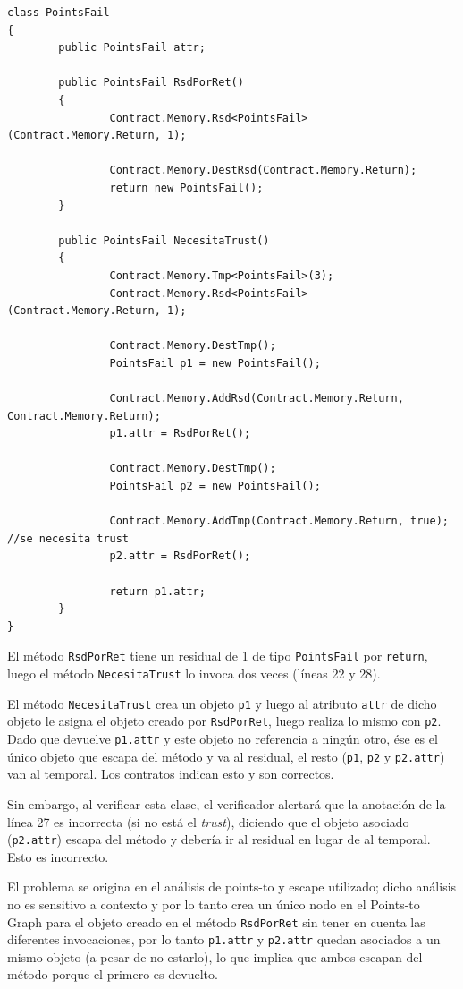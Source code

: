 \documentclass[12pt,a4paper]{article}
\newcommand\mono[1]{\texttt{#1}}
\begin{document}
			\vspace{15pt}
			\begin{footnotesize}
			\begin{lstlisting}[caption=Ejemplo donde \textit{trust} es necesario]
class PointsFail
{
		public PointsFail attr;

		public PointsFail RsdPorRet()
		{
				Contract.Memory.Rsd<PointsFail>(Contract.Memory.Return, 1);

				Contract.Memory.DestRsd(Contract.Memory.Return);
				return new PointsFail();
		}

		public PointsFail NecesitaTrust()
		{
				Contract.Memory.Tmp<PointsFail>(3);
				Contract.Memory.Rsd<PointsFail>(Contract.Memory.Return, 1);

				Contract.Memory.DestTmp();
				PointsFail p1 = new PointsFail();

				Contract.Memory.AddRsd(Contract.Memory.Return, Contract.Memory.Return);
				p1.attr = RsdPorRet();

				Contract.Memory.DestTmp();
				PointsFail p2 = new PointsFail();

				Contract.Memory.AddTmp(Contract.Memory.Return, true); //se necesita trust
				p2.attr = RsdPorRet();

				return p1.attr;
		}
}
			\end{lstlisting}
			\end{footnotesize}

			El método \mono{RsdPorRet} tiene un residual de 1 de tipo \mono{PointsFail} por \mono{return}, luego el método \mono{NecesitaTrust} lo invoca dos veces (líneas 22 y 28).

			El método \mono{NecesitaTrust} crea un objeto \mono{p1} y luego al atributo \mono{attr} de dicho objeto le asigna el objeto creado por \mono{RsdPorRet}, luego realiza lo mismo con \mono{p2}. Dado que devuelve \mono{p1.attr} y este objeto no referencia a ningún otro, ése es el único objeto que escapa del método y va al residual, el resto (\mono{p1}, \mono{p2} y \mono{p2.attr}) van al temporal. Los contratos indican esto y son correctos.
			
			Sin embargo, al verificar esta clase, el verificador alertará que la anotación de la línea 27 es incorrecta (si no está el \textit{trust}), diciendo que el objeto asociado (\mono{p2.attr}) escapa del método y debería ir al residual en lugar de al temporal. Esto es incorrecto.
			
			El problema se origina en el análisis de points-to y escape utilizado; dicho análisis no es sensitivo a contexto y por lo tanto crea un único nodo en el Points-to Graph para el objeto creado en el método \mono{RsdPorRet} sin tener en cuenta las diferentes invocaciones, por lo tanto \mono{p1.attr} y \mono{p2.attr} quedan asociados a un mismo objeto (a pesar de no estarlo), lo que implica que ambos escapan del método porque el primero es devuelto.
\end{document}
